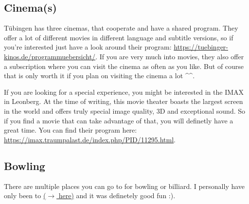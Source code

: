 \subsection{Cinema(s)}
Tübingen has three cinemas, that cooperate and have a shared program. They offer a lot of different movies in different language and subtitle versions, so if you're interested just have a look around their program: \url{https://tuebinger-kinos.de/programmuebersicht/}.
If you are very much into movies, they also offer a subscription where you can visit the cinema as often as you like. But of course that is only worth it if you plan on visiting the cinema a lot \^{}\^{}.

If you are looking for a special experience, you might be interested in the IMAX in Leonberg. At the time of writing, this movie theater boasts the largest screen in the world and offers truly special image quality, 3D and exceptional sound. So if you find a movie that can take advantage of that, you will definetly have a great time. You can find their program here: \url{https://imax.traumpalast.de/index.php/PID/11295.html}.

\subsection{Bowling}
There are multiple places you can go to for bowling or billiard. I personally have only been to  \href{https://maps.app.goo.gl/dgMVABnYTJC7qGBT8}{($\xrightarrow{}$ here)} and it was definetely good fun :). 